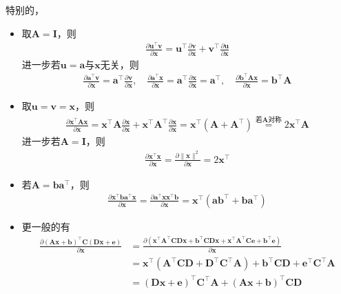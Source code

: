 \documentclass{ctexart}
\theoremstyle{definition}
\def \av {\bm{a}}
\def \bv {\bm{b}}
\def \ev {\bm{e}}
\def \uv {\bm{u}}
\def \vv {\bm{v}}
\def \xv {\bm{x}}
\def \Av {\mathbf{A}}
\def \Cv {\mathbf{C}}
\def \Dv {\mathbf{D}}
\def \Iv {\mathbf{I}}
\begin{document}
特别的，
\begin{itemize}
    \item 取$\Av = \Iv$，则
          \begin{align*}
              \frac{\partial \uv^\top \vv}{\partial \xv} = \uv^\top \frac{\partial \vv}{\partial \xv} + \vv^\top \frac{\partial \uv}{\partial \xv}
          \end{align*}
          进一步若$\uv = \av$与$\xv$无关，则
          \begin{align*}
              \frac{\partial \av^\top \vv}{\partial \xv} = \av^\top \frac{\partial \vv}{\partial \xv}, \quad \frac{\partial \av^\top \xv}{\partial \xv} = \av^\top \frac{\partial \xv}{\partial \xv} = \av^\top, \quad \frac{\partial \bv^\top \Av \xv}{\partial \xv} = \bv^\top \Av
          \end{align*}
    \item 取$\uv = \vv = \xv$，则
          \begin{align*}
              \frac{\partial \xv^\top \Av \xv}{\partial \xv} = \xv^\top \Av \frac{\partial \xv}{\partial \xv} + \xv^\top \Av^\top \frac{\partial \xv}{\partial \xv} = \xv^\top (\Av + \Av^\top) \overset{\text{若}\Av\text{对称}}{=} 2 \xv^\top \Av
          \end{align*}
          进一步若$\Av = \Iv$，则
          \begin{align*}
              \frac{\partial \xv^\top \xv}{\partial \xv} = \frac{\partial \|\xv\|^2}{\partial \xv} = 2 \xv^\top
          \end{align*}
    \item 若$\Av = \bv \av^\top$，则
          \begin{align*}
              \frac{\partial \xv^\top \bv \av^\top \xv}{\partial \xv} = \frac{\partial \av^\top \xv \xv^\top \bv}{\partial \xv} = \xv^\top (\av \bv^\top + \bv \av^\top)
          \end{align*}
    \item 更一般的有
          \begin{align*}
              \frac{\partial (\Av \xv + \bv)^\top \Cv (\Dv \xv + \ev)}{\partial \xv} & = \frac{\partial (\xv^\top \Av^\top \Cv \Dv \xv + \bv^\top \Cv \Dv \xv + \xv^\top \Av^\top \Cv \ev + \bv^\top \ev)}{\partial \xv} \\
                                                                                     & = \xv^\top (\Av^\top \Cv \Dv + \Dv^\top \Cv^\top \Av) + \bv^\top \Cv \Dv + \ev^\top \Cv^\top \Av                                  \\
                                                                                     & = (\Dv \xv + \ev)^\top \Cv^\top \Av + (\Av \xv + \bv)^\top \Cv \Dv
          \end{align*}
\end{itemize}
\end{document}
